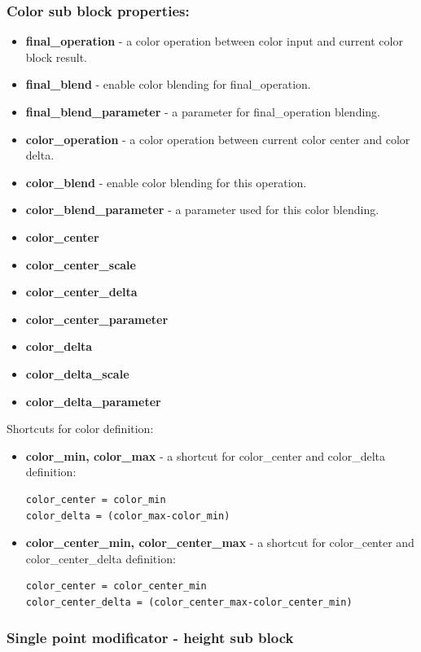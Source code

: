 \documentclass[9pt]{article}
\begin{document}
\subsubsection*{Color sub block properties:}
\begin{itemize}
\item{\bf final\_operation} - a color operation between color input and 
current color block result.
\item{\bf final\_blend} - enable color blending for final\_operation.
\item{\bf final\_blend\_parameter} - a parameter for final\_operation blending.

\item{\bf color\_operation} - a color operation between current color center and
color delta.
\item{\bf color\_blend} - enable color blending for this operation.
\item{\bf color\_blend\_parameter} - a parameter used for this color blending.

\item{\bf color\_center}
\item{\bf color\_center\_scale}
\item{\bf color\_center\_delta}
\item{\bf color\_center\_parameter}

\item{\bf color\_delta}
\item{\bf color\_delta\_scale}
\item{\bf color\_delta\_parameter}
\end{itemize}
Shortcuts for color definition:
\begin{itemize}
\item{\bf color\_min, color\_max} - a shortcut for color\_center and color\_delta
definition:
\begin{verbatim}
color_center = color_min
color_delta = (color_max-color_min)
\end{verbatim}
\item{\bf color\_center\_min, color\_center\_max} - a shortcut for color\_center
and color\_center\_delta definition:
\begin{verbatim}
color_center = color_center_min
color_center_delta = (color_center_max-color_center_min)
\end{verbatim}
\end{itemize}

\subsubsection{Single point modificator - height sub block}
\end{document}
